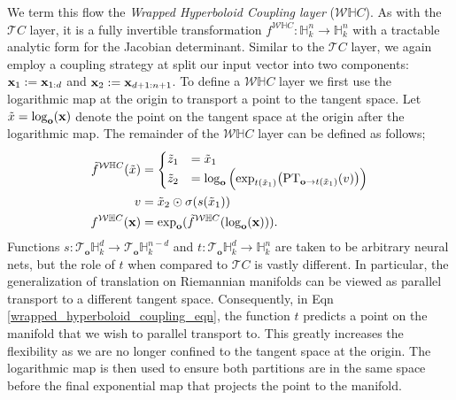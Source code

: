 We term this flow the {\em Wrapped Hyperboloid Coupling layer} ($\mathcal{W}\mathbb{H}C$).
As with the $\mathcal{T}C$ layer, it is a fully invertible transformation $f^{\mathcal{W}\mathbb{H}C}: \mathbb{H}^n_k \to \mathbb{H}^n_k$ with a tractable analytic form for the Jacobian determinant. 
Similar to the $\mathcal{T}C$ layer, we again employ a coupling strategy at split our input vector into two components: $\mathbf{x}_1:=\mathbf{x}_{1:d}$ and $\mathbf{x}_2:=\mathbf{x}_{d+1:n+1}$.
To define a $\mathcal{W}\mathbb{H}C$ layer we first use the logarithmic map at the origin to transport a point to the tangent space. Let $\tilde{x} = \log_{\textbf{o}}(\mathbf{x})$ denote the point on the tangent space at the origin after the logarithmic map. 
The remainder of the $\mathcal{W}\mathbb{H}C$ layer can be defined as follows;
\begin{align}
\label{wrapped_hyperboloid_coupling_eqn}
\tilde{f}^{\mathcal{W}\mathbb{H}C}(\tilde{x})&=
     \begin{cases}
     \tilde{z}_{1} &= \tilde{x}_{1}  \\
     \tilde{z}_{2} &= \log_{\textbf{o}}\Big( \textnormal{exp}_{t(\tilde{x}_{1})}\big(\textnormal{PT}_{\textbf{o}\to t(\tilde{x}_{1}) }(v)\big)\Big) \nonumber
    \end{cases}\\
    v &= \tilde{x}_{2} \odot \sigma(s(\tilde{x}_{1})) \nonumber \\
    f^{\mathcal{W}\mathbb{H}C}(\mathbf{x}) &=  \textnormal{exp}_{\textbf{o}}(\tilde{f}^{\mathcal{W}\mathbb{H}C}(\log_{\textbf{o}}(\mathbf{x}))).
\end{align}
Functions $s: \mathcal{T}_{\textbf{o}}\mathbb{H}^{d}_k \to \mathcal{T}_{\textbf{o}}\mathbb{H}^{n-d}_k$ and $t:\mathcal{T}_{\textbf{o}}\mathbb{H}^{d}_k \to \mathbb{H}^n_k$ are taken to be arbitrary neural nets, but the role of $t$ when compared to $\mathcal{T}C$ is vastly different. In particular, the generalization of translation on Riemannian manifolds can be viewed as parallel transport to a different tangent space. Consequently, in Eqn \ref{wrapped_hyperboloid_coupling_eqn}, the function $t$ predicts a point on the manifold that we wish to parallel transport to.
This greatly increases the flexibility as we are no longer confined to the tangent space at the origin. The logarithmic map is then used to ensure both partitions are in the same space before the final exponential map that projects the point to the manifold.

